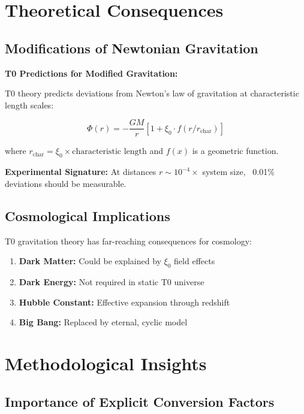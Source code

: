 	\section{Theoretical Consequences}
	
	\subsection{Modifications of Newtonian Gravitation}
	
	\begin{warning}
		\textbf{T0 Predictions for Modified Gravitation:}
		
		T0 theory predicts deviations from Newton's law of gravitation at characteristic length scales:
		
		\begin{equation}
			\Phi(r) = -\frac{GM}{r} \left[1 + \xi_0 \cdot f(r/r_{\text{char}})\right]
		\end{equation}
		
		where $r_{\text{char}} = \xi_0 \times \text{characteristic length}$ and $f(x)$ is a geometric function.
		
		\textbf{Experimental Signature:} At distances $r \sim 10^{-4} \times$ system size, ~0.01\% deviations should be measurable.
	\end{warning}
	
	\subsection{Cosmological Implications}
	
	T0 gravitation theory has far-reaching consequences for cosmology:
	
	\begin{enumerate}
		\item \textbf{Dark Matter:} Could be explained by $\xi_0$ field effects
		\item \textbf{Dark Energy:} Not required in static T0 universe
		\item \textbf{Hubble Constant:} Effective expansion through redshift
		\item \textbf{Big Bang:} Replaced by eternal, cyclic model
	\end{enumerate}
	
	\section{Methodological Insights}
	
	\subsection{Importance of Explicit Conversion Factors}
	
